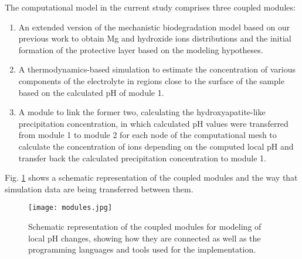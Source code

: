 The computational model in the current study comprises three coupled modules:
\begin{enumerate}
\item
An extended version of the mechanistic biodegradation model based on our previous work \cite{Barzegari2021} to obtain Mg and hydroxide ions distributions and the initial formation of the protective layer based on the modeling hypotheses.
\item
A thermodynamics-based simulation to estimate the concentration of various components of the electrolyte in regions close to the surface of the sample based on the calculated pH of module 1.
\item
A module to link the former two, calculating the hydroxyapatite-like precipitation concentration, in which calculated pH values were transferred from module 1 to module 2 for each node of the computational mesh to calculate the concentration of ions depending on the computed local pH and transfer back the calculated precipitation concentration to module 1.
\end{enumerate}

Fig. \ref{fig:kinetics_modules} shows a schematic representation of the coupled modules and the way that simulation data are being transferred between them.

\begin{figure}[h]
\centering
\medskip
\texttt{[image: modules.jpg]}
\caption[Schematic representation of the coupled modules for modeling of local pH changes]{Schematic representation of the coupled modules for modeling of local pH changes, showing how they are connected as well as the programming languages and tools used for the implementation.} \label{fig:kinetics_modules}
\end{figure}

